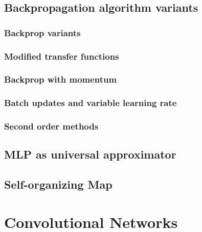 \documentclass[12pt, letterpaper, twoside]{article}
\begin{document}
\subsection{Backpropagation algorithm variants}

\subsubsection{Backprop variants}

\subsubsection{Modified transfer functions}

\subsubsection{Backprop with momentum}

\subsubsection{Batch updates and variable learning rate}

\subsubsection{Second order methods}

\subsection{MLP as universal approximator}

\subsection{Self-organizing Map}

\section{Convolutional Networks}
\end{document}
